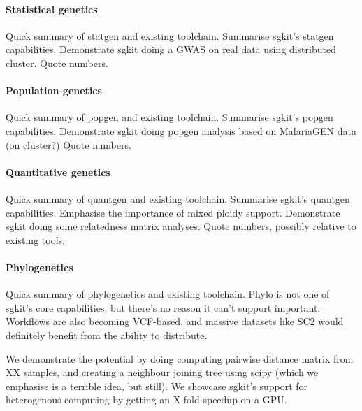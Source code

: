 \documentclass[a4paper,num-refs]{oup-contemporary}
\begin{document}
\paragraph{Statistical genetics}
Quick summary of statgen and existing toolchain.
Summarise sgkit's statgen capabilities.
Demonstrate sgkit doing a GWAS on real data using distributed cluster.
Quote numbers.

\paragraph{Population genetics}
Quick summary of popgen and existing toolchain.
Summarise sgkit's popgen capabilities.
Demonstrate
sgkit doing popgen analysis based on MalariaGEN data (on cluster?)
Quote numbers.

\paragraph{Quantitative genetics}
Quick summary of quantgen and existing toolchain.
Summarise sgkit's quantgen capabilities. Emphasise the importance
of mixed ploidy support.
Demonstrate sgkit doing some relatedness matrix analyses.
Quote numbers, possibly relative to existing tools.

\paragraph{Phylogenetics}
Quick summary of phylogenetics and existing toolchain.
Phylo is not one of sgkit's core capabilities, but there's no
reason it can't support important. Workflows are also becoming
VCF-based, and massive datasets like SC2 would definitely
benefit from the ability to distribute.

We demonstrate the potential by doing computing pairwise
distance matrix from XX samples, and creating a neighbour
joining tree using scipy (which we emphasise is a terrible
idea, but still). We showcase sgkit's support for heterogenous
computing by getting an X-fold speedup on a GPU.
\end{document}
